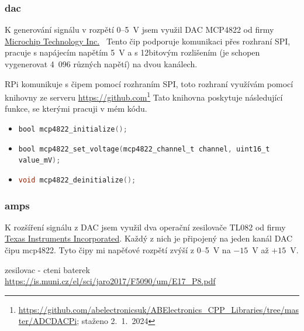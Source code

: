 \subsubsection{dac}
K generování signálu v rozpětí 0--5~V jsem využil DAC MCP4822 od firmy \href{https://www.microchip.com}{Microchip Technology Inc.}\ 
Tento čip podporuje komunikaci přes rozhraní SPI, pracuje s napájecím napětím 5~V a s 12bitovým rozlišením (je schopen vygenerovat 4~096 různých napětí) na dvou kanálech.

RPi komunikuje s čipem pomocí rozhraním SPI, toto rozhraní využívám pomocí knihovny ze serveru \url{https://github.com}\footnote{\url{https://github.com/abelectronicsuk/ABElectronics_CPP_Libraries/tree/master/ADCDACPi}; staženo 2.~1.~2024} 
Tato knihovna poskytuje následující funkce, se kterými pracuji v mém kódu.
\begin{itemize}
\item
\lstinline[language=C]!bool mcp4822_initialize();!
\item
\lstinline[language=C]!bool mcp4822_set_voltage(mcp4822_channel_t channel, uint16_t value_mV);!
\item
\lstinline[language=C]!void mcp4822_deinitialize();!
\end{itemize}
\subsubsection{amps}
K rozšíření signálu z DAC jsem využil dva operační zesilovače TL082 od firmy \href{https://www.ti.com/}{Texas Instruments Incorporated}. Každý z nich je připojený na jeden kanál DAC čipu mcp4822.
Tyto čipy mi napěťové rozpětí zvýší z 0--5~V na $-15$~V až $+15$~V.

zesilovac - cteni baterek \url{https://is.muni.cz/el/sci/jaro2017/F5090/um/E17_P8.pdf}
